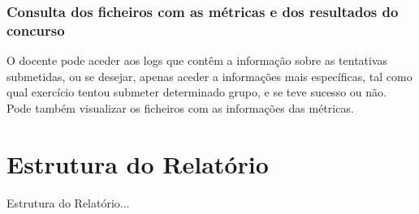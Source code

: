 \subsubsection{Consulta dos ficheiros com as métricas e dos resultados do concurso}
O docente pode aceder aos logs que contêm a informação sobre as tentativas submetidas, ou se desejar, apenas aceder a informações mais específicas, tal como 
qual exercício tentou submeter determinado grupo, e se teve sucesso ou não.\\
Pode também visualizar os ficheiros com as informações das métricas.

\section{Estrutura do Relatório}
Estrutura do Relatório...
